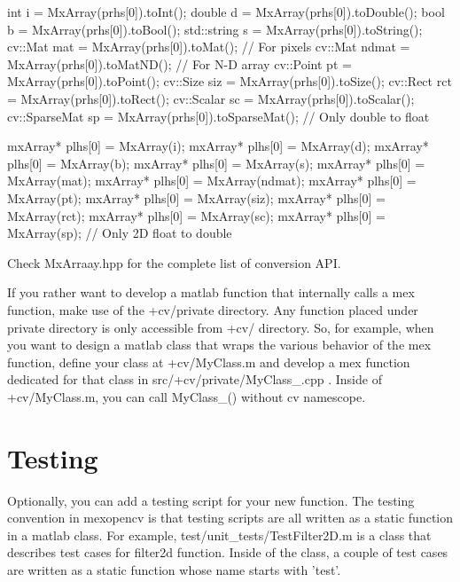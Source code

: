 \begin{DoxyCode}
    int i            = MxArray(prhs[0]).toInt();
    double d         = MxArray(prhs[0]).toDouble();
    bool b           = MxArray(prhs[0]).toBool();
    std::string s    = MxArray(prhs[0]).toString();
    cv::Mat mat      = MxArray(prhs[0]).toMat();   // For pixels
    cv::Mat ndmat    = MxArray(prhs[0]).toMatND(); // For N-D array
    cv::Point pt     = MxArray(prhs[0]).toPoint();
    cv::Size siz     = MxArray(prhs[0]).toSize();
    cv::Rect rct     = MxArray(prhs[0]).toRect();
    cv::Scalar sc    = MxArray(prhs[0]).toScalar();
    cv::SparseMat sp = MxArray(prhs[0]).toSparseMat(); // Only double to float
\end{DoxyCode}
 
\begin{DoxyCode}
    mxArray* plhs[0] = MxArray(i);
    mxArray* plhs[0] = MxArray(d);
    mxArray* plhs[0] = MxArray(b);
    mxArray* plhs[0] = MxArray(s);
    mxArray* plhs[0] = MxArray(mat);
    mxArray* plhs[0] = MxArray(ndmat);
    mxArray* plhs[0] = MxArray(pt);
    mxArray* plhs[0] = MxArray(siz);
    mxArray* plhs[0] = MxArray(rct);
    mxArray* plhs[0] = MxArray(sc);
    mxArray* plhs[0] = MxArray(sp); // Only 2D float to double
\end{DoxyCode}


\-Check {\ttfamily \-Mx\-Arraay.\-hpp} for the complete list of conversion \-A\-P\-I.

\-If you rather want to develop a matlab function that internally calls a mex function, make use of the {\ttfamily +cv/private} directory. \-Any function placed under private directory is only accessible from {\ttfamily +cv/} directory. \-So, for example, when you want to design a matlab class that wraps the various behavior of the mex function, define your class at {\ttfamily +cv/\-My\-Class}.m and develop a mex function dedicated for that class in {\ttfamily src/+cv/private/\-My\-Class\-\_\-}.cpp . \-Inside of {\ttfamily +cv/\-My\-Class}.m, you can call {\ttfamily \-My\-Class\-\_\-()} without cv namescope.\hypertarget{index_testing}{}\section{\-Testing}\label{index_testing}
\-Optionally, you can add a testing script for your new function. \-The testing convention in mexopencv is that testing scripts are all written as a static function in a matlab class. \-For example, {\ttfamily test/unit\-\_\-tests/\-Test\-Filter2\-D.\-m} is a class that describes test cases for filter2d function. \-Inside of the class, a couple of test cases are written as a static function whose name starts with 'test'.

